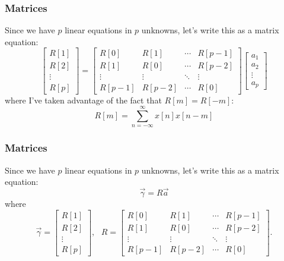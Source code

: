 \documentclass{beamer}
\begin{document}
\begin{frame}
  \frametitle{Matrices}

  Since we have $p$ linear equations in $p$ unknowns, let's write this
  as a matrix equation:
  \begin{displaymath}
    \left[\begin{array}{c}R[1]\\ R[2]\\\vdots\\ R[p]\end{array}\right] =
    \left[\begin{array}{cccc} R[0] & R[1] &  \cdots & R[p-1] \\
        R[1] & R[0] & \cdots & R[p-2] \\
        \vdots & \vdots & \ddots & \vdots \\
        R[p-1] & R[p-2] & \cdots & R[0] \end{array}\right]
    \left[\begin{array}{c}a_1\\a_2\\\vdots\\a_p\end{array}\right]
  \end{displaymath}
  where I've taken advantage of the fact that $R[m]=R[-m]$:
  \begin{displaymath}
    R[m] = \sum_{n=-\infty}^\infty x[n]x[n-m]
  \end{displaymath}
\end{frame}
      
\begin{frame}
  \frametitle{Matrices}

  Since we have $p$ linear equations in $p$ unknowns, let's write this
  as a matrix equation:
  \begin{displaymath}
    \vec\gamma = R \vec{a}
  \end{displaymath}
  where
  \begin{displaymath}
    \vec\gamma = \left[\begin{array}{c}R[1]\\ R[2]\\\vdots\\ R[p]\end{array}\right],~~~
    R = \left[\begin{array}{cccc} R[0] & R[1] &  \cdots & R[p-1] \\
        R[1] & R[0] & \cdots & R[p-2] \\
        \vdots & \vdots & \ddots & \vdots \\
        R[p-1] & R[p-2] & \cdots & R[0] \end{array}\right].
  \end{displaymath}
\end{frame}
\end{document}
